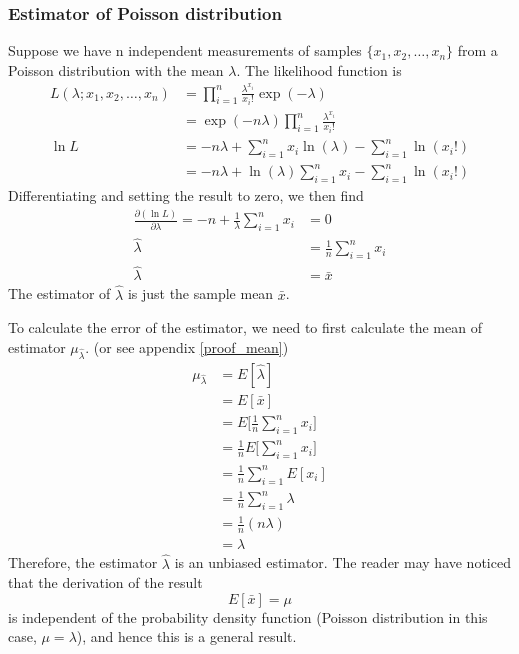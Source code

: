 \documentclass[12pt,a4paper]{report}
\begin{document}
\subsubsection{Estimator of Poisson distribution}
Suppose we have n independent measurements of samples $\{ x_1, x_2, \dots , x_n \}$ from a Poisson distribution with the mean $\lambda$. The likelihood function is
\begin{align*}
L(\lambda;x_1,x_2,\dots,x_n) &= \prod_{i = 1}^{n} \frac{\lambda^{x_i}}{x_i !} \exp(-\lambda) \\
&= \exp(-n \lambda) \prod_{i = 1}^{n} \frac{\lambda^{x_i}}{x_i !} \\
\ln L &= -n \lambda + \sum_{i = 1}^{n} x_i \ln(\lambda) - \sum_{i = 1}^{n} \ln(x_i !) \\
&= -n \lambda + \ln(\lambda) \sum_{i = 1}^{n} x_i - \sum_{i = 1}^{n} \ln(x_i !)
\end{align*}
Differentiating and setting the result to zero, we then find
\begin{align*}
\frac{\partial ( \ln L )}{\partial \lambda} = -n + \frac{1}{\lambda} \sum_{i = 1}^{n} x_i &= 0 \\
\hat{\lambda} &= \frac{1}{n} \sum_{i = 1}^{n} x_i \\
\hat{\lambda} &= \bar{x}
\end{align*}
The estimator of $\hat{\lambda}$ is just the sample mean $\bar{x}$.

To calculate the error of the estimator, we need to first calculate the mean of estimator $\mu_{\hat{\lambda}}$. (or see appendix \ref{proof_mean})
\begin{align*}
\mu_{\hat{\lambda}}
&= E[\hat{\lambda}] \\
&= E[\bar{x}] \\
&= E \Bigg[ \frac{1}{n} \sum_{i=1}^n x_i \Bigg] \\
&= \frac{1}{n} E \Bigg[ \sum_{i=1}^n x_i \Bigg] \\
&= \frac{1}{n} \sum_{i=1}^n E[x_i] \\
&= \frac{1}{n} \sum_{i=1}^n \lambda \\
&= \frac{1}{n} (n \lambda) \\
&= \lambda
\end{align*}
Therefore, the estimator $\hat{\lambda}$ is an unbiased estimator.
The reader may have noticed that the derivation of the result
\begin{equation} \label{mean_of_sample_mean}
E[\bar{x}]  = \mu
\end{equation}
is independent of the probability density function (Poisson distribution in this case, $\mu=\lambda$), and hence this is a general result.
\end{document}
